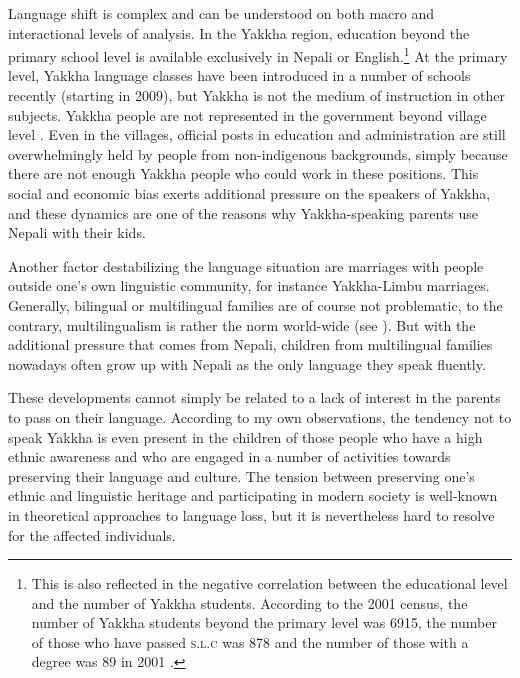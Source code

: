 Language shift is complex and can be understood on both macro and interactional levels of analysis. In the Yakkha region, education beyond the primary school level is available exclusively in Nepali or English.\footnote{This is also reflected in the negative correlation between the educational level and the number of Yakkha students. According to the 2001 census, the number of Yakkha students beyond the primary level was 6915, the number of those who have passed \textsc{s.l.c} was 878 and the number of those with a degree was 89 in 2001 \citep{CBS2001Report}.} At the primary level, Yakkha language classes have been introduced in a number of schools recently (starting in 2009), but Yakkha is not the medium of instruction in other subjects. Yakkha people are not represented in the government beyond village level \citep{CBS2001Report}. Even in the villages, official posts in education and administration are still overwhelmingly held by people from  non-indigenous backgrounds, simply because there are not enough Yakkha people who could work in these positions. This social and economic bias exerts additional pressure on the speakers of Yakkha, and these dynamics are one of the reasons why Yakkha-speaking parents use Nepali with their kids. 


Another factor destabilizing the language situation are marriages with people outside one's  own linguistic community, for instance Yakkha-Limbu marriages. Generally, bilingual or multilingual families are of course not problematic, to the contrary, multilingualism is rather the norm world-wide (see \citealt{Turin2007_Diversity}). But with the additional pressure that comes from Nepali, children from multilingual families nowadays often grow up with Nepali as the only language they speak fluently. 

These developments cannot simply be related to a lack of interest in the parents to pass on their language. According to my own observations, the tendency not to speak Yakkha is even present in the children of those people who have a high ethnic awareness and who are engaged in a number of activities towards preserving their language and culture. The tension between preserving one's  ethnic and linguistic heritage and participating in modern society is well-known in theoretical approaches to language loss, but it is nevertheless hard to resolve for the affected individuals.

